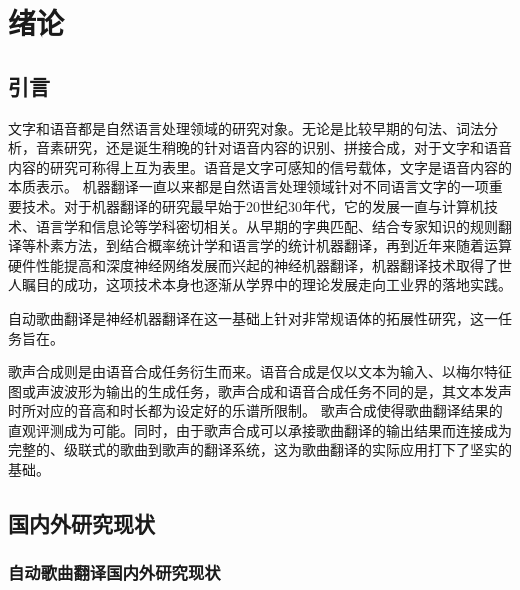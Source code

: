 \chapter{绪论}
\section{引言}
文字和语音都是自然语言处理领域的研究对象。无论是比较早期的句法、词法分析，音素研究，还是诞生稍晚的针对语音内容的识别、拼接合成，对于文字和语音内容的研究可称得上互为表里。语音是文字可感知的信号载体，文字是语音内容的本质表示。
机器翻译一直以来都是自然语言处理领域针对不同语言文字的一项重要技术。对于机器翻译的研究最早始于20世纪30年代，它的发展一直与计算机技术、语言学和信息论等学科密切相关。从早期的字典匹配、结合专家知识的规则翻译等朴素方法，到结合概率统计学和语言学的统计机器翻译，再到近年来随着运算硬件性能提高和深度神经网络发展而兴起的神经机器翻译，机器翻译技术取得了世人瞩目的成功，这项技术本身也逐渐从学界中的理论发展走向工业界的落地实践。

自动歌曲翻译是神经机器翻译在这一基础上针对非常规语体的拓展性研究，这一任务旨在。

歌声合成则是由语音合成任务衍生而来。语音合成是仅以文本为输入、以梅尔特征图或声波波形为输出的生成任务，歌声合成和语音合成任务不同的是，其文本发声时所对应的音高和时长都为设定好的乐谱所限制。
歌声合成使得歌曲翻译结果的直观评测成为可能。同时，由于歌声合成可以承接歌曲翻译的输出结果而连接成为完整的、级联式的歌曲到歌声的翻译系统，这为歌曲翻译的实际应用打下了坚实的基础。
\section{国内外研究现状}
\subsection{自动歌曲翻译国内外研究现状}
